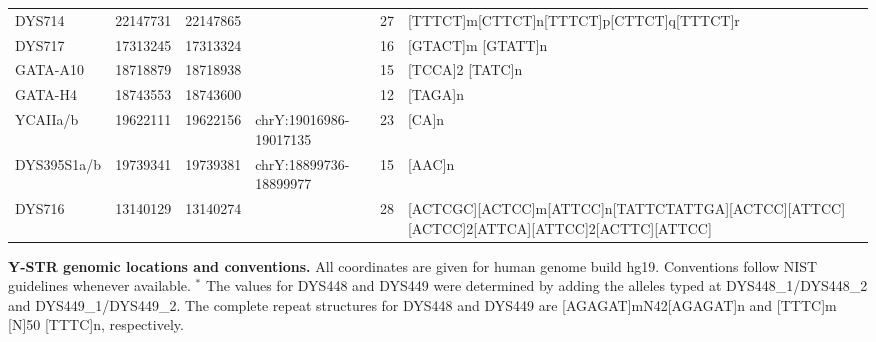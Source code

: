 \begin{tabularx}{\linewidth}{l l l l l l }
DYS714      & 22147731 & 22147865 &                        & 27 & {[}TTTCT{]}m{[}CTTCT{]}n{[}TTTCT{]}p{[}CTTCT{]}q{[}TTTCT{]}r                                                                         \\
DYS717      & 17313245 & 17313324 &                        & 16 & {[}GTACT{]}m {[}GTATT{]}n                                                                                                            \\
GATA-A10    & 18718879 & 18718938 &                        & 15 & {[}TCCA{]}2 {[}TATC{]}n                                                                                                              \\
GATA-H4     & 18743553 & 18743600 &                        & 12 & {[}TAGA{]}n                                                                                                                          \\
YCAIIa/b    & 19622111 & 19622156 & chrY:19016986-19017135 & 23 & {[}CA{]}n                                                                                                                            \\
DYS395S1a/b & 19739341 & 19739381 & chrY:18899736-18899977 & 15 & {[}AAC{]}n                                                                                                                           \\
DYS716      & 13140129 & 13140274 &                        & 28 & {[}ACTCGC{]}{[}ACTCC{]}m{[}ATTCC{]}n{[}TATTCTATTGA{]}{[}ACTCC{]}{[}ATTCC{]}{[}ACTCC{]}2{[}ATTCA{]}{[}ATTCC{]}2{[}ACTTC{]}{[}ATTCC{]} \\
\hline
\end{tabularx}
\textbf{Y-STR genomic locations and conventions.} All coordinates are given for human genome build hg19. Conventions follow NIST guidelines whenever available. $^*$ The values for DYS448 and DYS449 were determined by adding the alleles typed at DYS448\_1/DYS448\_2 and DYS449\_1/DYS449\_2. The complete repeat structures for DYS448 and DYS449 are  [AGAGAT]mN42[AGAGAT]n and [TTTC]m [N]50 [TTTC]n, respectively.

\pagebreak
